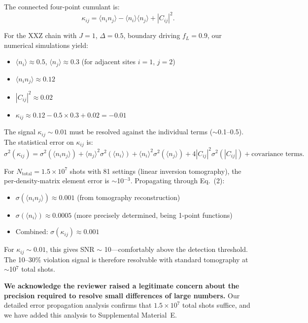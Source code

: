 \documentclass[11pt,a4paper]{article}
\begin{document}
The connected four-point cumulant is:
\begin{equation}
\kappa_{ij} = \langle n_i n_j \rangle - \langle n_i \rangle \langle n_j \rangle + |C_{ij}|^2.
\end{equation}

For the XXZ chain with $J = 1$, $\Delta = 0.5$, boundary driving $f_L = 0.9$, our numerical simulations yield:
\begin{itemize}[leftmargin=*]
\item $\langle n_i \rangle \approx 0.5$, $\langle n_j \rangle \approx 0.3$ (for adjacent sites $i=1$, $j=2$)
\item $\langle n_i n_j \rangle \approx 0.12$
\item $|C_{ij}|^2 \approx 0.02$
\item $\kappa_{ij} \approx 0.12 - 0.5 \times 0.3 + 0.02 = -0.01$
\end{itemize}

The signal $\kappa_{ij} \sim 0.01$ must be resolved against the individual terms ($\sim$0.1--0.5). The statistical error on $\kappa_{ij}$ is:
\begin{equation}
\sigma^2(\kappa_{ij}) = \sigma^2(\langle n_i n_j \rangle) + \langle n_j \rangle^2 \sigma^2(\langle n_i \rangle) + \langle n_i \rangle^2 \sigma^2(\langle n_j \rangle) + 4|C_{ij}|^2 \sigma^2(|C_{ij}|) + \text{covariance terms}.
\end{equation}

For $N_{\text{total}} = 1.5 \times 10^7$ shots with 81 settings (linear inversion tomography), the per-density-matrix element error is $\sim$10$^{-3}$. Propagating through Eq.~(2):
\begin{itemize}[leftmargin=*]
\item $\sigma(\langle n_i n_j \rangle) \approx 0.001$ (from tomography reconstruction)
\item $\sigma(\langle n_i \rangle) \approx 0.0005$ (more precisely determined, being 1-point functions)
\item Combined: $\sigma(\kappa_{ij}) \approx 0.001$
\end{itemize}

For $\kappa_{ij} \sim 0.01$, this gives SNR $\sim$ 10---comfortably above the detection threshold. The 10--30\% violation signal is therefore resolvable with standard tomography at $\sim$10$^7$ total shots.

\textbf{We acknowledge the reviewer raised a legitimate concern about the precision required to resolve small differences of large numbers.} Our detailed error propagation analysis confirms that $1.5 \times 10^7$ total shots suffice, and we have added this analysis to Supplemental Material~E.
\end{document}
